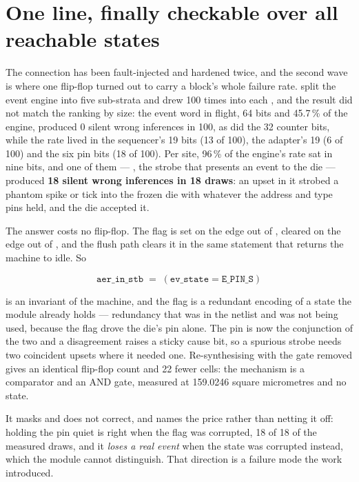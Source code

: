 \section{One line, finally checkable over all reachable states}

The connection has been fault-injected and hardened twice, and the
second wave is where one flip-flop turned out to carry a block's whole
failure rate.  split the event engine into five sub-strata
and drew 100 times into each \cite{leveugle2009}, and the result did not match the ranking
by size: the event word in flight, 64 bits and 45.7\,\% of the engine,
produced 0 silent wrong inferences in 100, as did the 32 counter bits,
while the rate lived in the sequencer's 19 bits (13 of 100), the
adapter's 19 (6 of 100) and the six pin bits (18 of 100). Per site,
96\,\% of the engine's rate sat in nine bits, and one of them ---
, the strobe that presents an event to the die ---
produced \textbf{18 silent wrong inferences in 18 draws}: an upset in
it strobed a phantom spike or tick into the frozen die with whatever
the address and type pins held, and the die accepted it.

The answer costs no flip-flop. The flag is set on the edge out of
, cleared on the edge out of , and the
flush path clears it in the same statement that returns the machine to
idle. So

\begin{equation}
\mathtt{aer\_in\_stb} \;=\; (\mathtt{ev\_state} = \mathtt{E\_PIN\_S})
\label{eq:h5}
\end{equation}

is an invariant of the machine, and the flag is a redundant encoding of
a state the module already holds --- redundancy that was in the netlist
and was not being used, because the flag drove the die's pin alone. The
pin is now the conjunction of the two and a disagreement raises a
sticky cause bit, so a spurious strobe needs two coincident upsets
where it needed one. Re-synthesising with the gate removed gives an
identical flip-flop count and 22 fewer cells: the mechanism is a
comparator and an AND gate, measured at 159.0246 square micrometres and
no state.

It masks and does not correct, and  names the
price rather than netting it off: holding the pin quiet is right when
the flag was corrupted, 18 of 18 of the measured draws, and it
\emph{loses a real event} when the state was corrupted instead, which
the module cannot distinguish. That direction is a failure mode the
work introduced.

